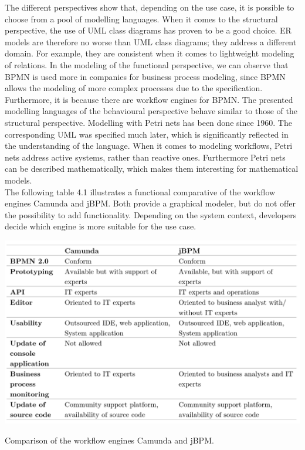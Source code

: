 The different perspectives show that, depending on the use case, it is possible to choose from a pool of modelling languages. When it comes to the structural perspective, the use of UML class diagrams has proven to be a good choice. ER models are therefore no worse than UML class diagrams; they address a different domain. For example, they are consistent when it comes to lightweight modeling of relations.
In the modeling of the functional perspective, we can observe that BPMN is used more in companies for business process modeling, since BPMN allows the modeling of more complex processes due to the specification. Furthermore, it is because there are workflow engines for BPMN. The presented modelling languages of the behavioural perspective behave similar to those of the structural perspective. Modelling with Petri nets has been done since 1960. The corresponding UML was specified much later, which is significantly reflected in the understanding of the language. When it comes to modeling workflows, Petri nets address active systems, rather than reactive ones. Furthermore Petri nets can be described mathematically, which makes them interesting for mathematical models. 
\\
The following table 4.1 illustrates a functional comparative of the workflow engines Camunda and jBPM. Both provide a graphical modeler, but do not offer the possibility to add functionality. Depending on the system context, developers decide which engine is more suitable for the use case. 

\begin{table}[!hb]
	\centering
	\label{tbl:TableLatexShortened}
	\includegraphics[scale=0.75]{EngineTable}
	\caption{Comparison of the workflow engines Camunda and jBPM.}
\end{table}






